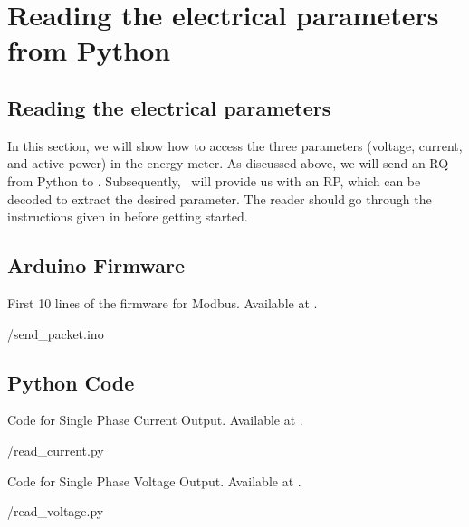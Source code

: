 \section{Reading the electrical parameters from Python}
\subsection{Reading the electrical parameters}
In this section, we will show how to access the three parameters (voltage, current, and active power) in the energy meter. As discussed above, we will send an RQ from Python to \arduino. Subsequently, \arduino\ will provide us with an RP, which can be decoded to extract the desired parameter. The reader should go through the instructions given in  before getting started. 

\subsection{Arduino Firmware}
\label{sec:firmware-modbus}
\begin{ardcode}
  {First 10 lines of the firmware for Modbus.  Available at
    .}
  \label{ard:firmware-modbus}
  
  {\LocMODardcode/send_packet.ino}
\end{ardcode}

\subsection{Python Code}
\label{sec:modbus-python-code}

\begin{pycode}
  {Code for Single Phase Current Output.
    Available at .}
  \label{py:current-modbus}
  
  {\LocMODpycode/read_current.py}
\end{pycode}

\begin{pycode}
  {Code for Single Phase Voltage Output.
    Available at .}
  \label{py:voltage-modbus}
  
  {\LocMODpycode/read_voltage.py}
\end{pycode}

